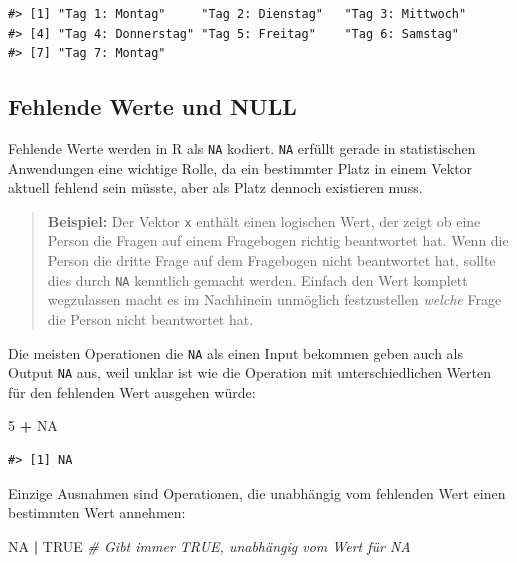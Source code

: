 \documentclass[]{book}
\newenvironment{Shaded}{\begin{snugshade}}{\end{snugshade}}
\newcommand{\DecValTok}[1]{\textcolor[rgb]{0.00,0.00,0.81}{#1}}
\newcommand{\StringTok}[1]{\textcolor[rgb]{0.31,0.60,0.02}{#1}}
\newcommand{\CommentTok}[1]{\textcolor[rgb]{0.56,0.35,0.01}{\textit{#1}}}
\newcommand{\OtherTok}[1]{\textcolor[rgb]{0.56,0.35,0.01}{#1}}
\newcommand{\OperatorTok}[1]{\textcolor[rgb]{0.81,0.36,0.00}{\textbf{#1}}}
\begin{document}
\begin{verbatim}
#> [1] "Tag 1: Montag"     "Tag 2: Dienstag"   "Tag 3: Mittwoch"  
#> [4] "Tag 4: Donnerstag" "Tag 5: Freitag"    "Tag 6: Samstag"   
#> [7] "Tag 7: Montag"
\end{verbatim}

\subsection{Fehlende Werte und NULL}\label{fehlende-werte-und-null}

Fehlende Werte werden in R als \texttt{NA} kodiert. \texttt{NA} erfüllt
gerade in statistischen Anwendungen eine wichtige Rolle, da ein
bestimmter Platz in einem Vektor aktuell fehlend sein müsste, aber als
Platz dennoch existieren muss.

\begin{quote}
\textbf{Beispiel:} Der Vektor \texttt{x} enthält einen logischen Wert,
der zeigt ob eine Person die Fragen auf einem Fragebogen richtig
beantwortet hat. Wenn die Person die dritte Frage auf dem Fragebogen
nicht beantwortet hat, sollte dies durch \texttt{NA} kenntlich gemacht
werden. Einfach den Wert komplett wegzulassen macht es im Nachhinein
unmöglich festzustellen \emph{welche} Frage die Person nicht beantwortet
hat.
\end{quote}

Die meisten Operationen die \texttt{NA} als einen Input bekommen geben
auch als Output \texttt{NA} aus, weil unklar ist wie die Operation mit
unterschiedlichen Werten für den fehlenden Wert ausgehen würde:

\begin{Shaded}
\begin{Highlighting}[]
\DecValTok{5} \OperatorTok{+}\StringTok{ }\OtherTok{NA}
\end{Highlighting}
\end{Shaded}

\begin{verbatim}
#> [1] NA
\end{verbatim}

Einzige Ausnahmen sind Operationen, die unabhängig vom fehlenden Wert
einen bestimmten Wert annehmen:

\begin{Shaded}
\begin{Highlighting}[]
\OtherTok{NA} \OperatorTok{|}\StringTok{ }\OtherTok{TRUE} \CommentTok{# Gibt immer TRUE, unabhängig vom Wert für NA}
\end{Highlighting}
\end{Shaded}
\end{document}
